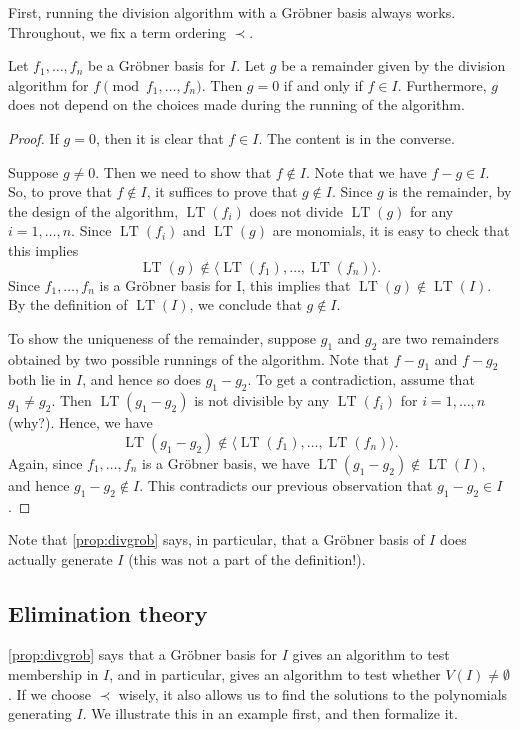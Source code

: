 \documentclass[11pt]{article}
\DeclareMathOperator{\LT}{LT}
\begin{document}
First, running the division algorithm with a Gr\"obner basis always works.
Throughout, we fix a term ordering $\prec$.
\begin{proposition}\label{prop:divgrob}
  Let $f_1, \dots, f_n$ be a Gr\"obner basis for $I$.
  Let $g$ be a remainder given by the division algorithm for $f \pmod {f_1, \dots, f_n}$.
  Then $g = 0$ if and only if $f \in I$.
  Furthermore, $g$ does not depend on the choices made during the running of the algorithm.
\end{proposition}
\begin{proof}
  If $g = 0$, then it is clear that $f \in I$.
  The content is in the converse.

  Suppose $g \neq 0$.
  Then we need to show that $f \not \in I$.
  Note that we have $f-g \in I$.
  So, to prove that $f \not \in I$, it suffices to prove that $g \not \in I$.
  Since $g$ is the remainder, by the design of the algorithm, $\LT(f_i)$ does not divide $\LT(g)$ for any $i = 1,\dots, n$.
  Since $\LT(f_i)$ and $\LT(g)$ are monomials, it is easy to check that this implies
  \[ \LT(g) \not \in \langle  \LT(f_1), \dots, \LT(f_n) \rangle.\]
  Since $f_1, \dots, f_n$ is a Gr\"obner basis for I, this implies that $\LT(g) \not \in \LT(I)$.
  By the definition of $\LT(I)$, we conclude that $g \not \in I$.

  To show the uniqueness of the remainder, suppose $g_1$ and $g_2$ are two remainders obtained by two possible runnings of the algorithm.
  Note that $f-g_1$ and $f-g_2$ both lie in $I$, and hence so does $g_1-g_2$.
  To get a contradiction, assume that $g_1 \neq g_2$.
  Then $\LT(g_1 - g_2)$ is not divisible by any $\LT(f_i)$ for $i = 1,\dots,n$ (why?).
  Hence, we have
  \[\LT(g_1-g_2) \not \in \langle \LT(f_1), \dots, \LT(f_n) \rangle.\]
  Again, since $f_1, \dots, f_n$ is a Gr\"obner basis, we have $\LT(g_1-g_2) \not \in \LT(I)$, and hence $g_1 -g_2 \not \in I$.
  This contradicts our previous observation that $g_1-g_2 \in I$.
\end{proof}
Note that \autoref{prop:divgrob} says, in particular, that a Gr\"obner basis of $I$ does actually generate $I$ (this was not a part of the definition!).

\subsection{Elimination theory}
\autoref{prop:divgrob} says that a Gr\"obner basis for $I$ gives an algorithm to test membership in $I$, and in particular, gives an algorithm to test whether $V(I) \neq \emptyset$.
If we choose $\prec$ wisely, it also allows us to find the solutions to the polynomials generating $I$.
We illustrate this in an example first, and then formalize it.
\end{document}
